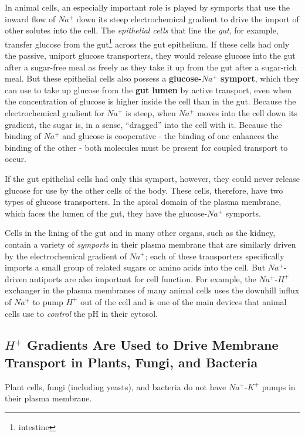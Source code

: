 In animal cells, an especially important role is played by symports that
use the inward flow of $Na^{+}$ down its steep electrochemical gradient to
drive the import of other solutes into the cell. The \textit{epithelial cells} that line
the \textit{gut}, for example, transfer glucose from the gut\footnote{intestine} across the gut epithelium.
If these cells had only the passive, uniport glucose transporters,
they would release glucose into the gut after a sugar-free meal as freely
as they take it up from the gut after a sugar-rich meal. But these epithelial
cells also possess a \textbf{glucose-$Na^{+}$ symport}, which they can use to take up
glucose from the \textbf{gut lumen} by active transport, even when the concentration of
glucose is higher inside the cell than in the gut. Because the
electrochemical gradient for $Na^{+}$ is steep, when $Na^{+}$ moves into the cell
down its gradient, the sugar is, in a sense, “dragged” into the cell with it.
Because the binding of $Na^{+}$ and glucose is cooperative -
the binding of one enhances the binding of the other - both molecules
must be present for coupled transport to occur.

If the gut epithelial cells had only this symport, however, they could never
release glucose for use by the other cells of the body. These cells, therefore,
have two types of glucose transporters. In the apical domain of the plasma
membrane, which faces the lumen of the gut, they have the glucose-$Na^{+}$
symports.

Cells in the lining of the gut and in many other organs, such as the kidney,
contain a variety of \textit{symports} in their plasma membrane that are similarly
driven by the electrochemical gradient of $Na^{+}$; each of these transporters
specifically imports a small group of related sugars or amino acids into
the cell. But $Na^{+}$-driven antiports are also important for cell function. For
example, the $Na^{+}$-$H^{+}$ exchanger in the plasma membranes of many animal
cells uses the downhill influx of $Na^{+}$ to pump $H^{+}$ out of the cell and
is one of the main devices that animal cells use to \textit{control} the pH in their
cytosol.

\subsection{$H^{+}$ Gradients Are Used to Drive Membrane Transport in Plants, Fungi, and Bacteria}

Plant cells, fungi (including yeasts), and bacteria do not have $Na^{+}$-$K^{+}$
pumps in their plasma membrane. 

